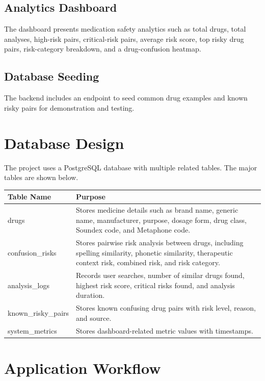 \documentclass[12pt,a4paper]{article}
\begin{document}
\subsection{Analytics Dashboard}

The dashboard presents medication safety analytics such as total drugs, total analyses, high-risk pairs, critical-risk pairs, average risk score, top risky drug pairs, risk-category breakdown, and a drug-confusion heatmap.

\subsection{Database Seeding}

The backend includes an endpoint to seed common drug examples and known risky pairs for demonstration and testing.

\section{Database Design}

The project uses a PostgreSQL database with multiple related tables. The major tables are shown below.

\begin{table}[h!]
\centering
{}
\begin{tabularx}{\textwidth}{p{3.7cm}Y}
\toprule
{}
\textbf{Table Name} & \textbf{Purpose} \\
\midrule
drugs & Stores medicine details such as brand name, generic name, manufacturer, purpose, dosage form, drug class, Soundex code, and Metaphone code. \\
confusion\_risks & Stores pairwise risk analysis between drugs, including spelling similarity, phonetic similarity, therapeutic context risk, combined risk, and risk category. \\
analysis\_logs & Records user searches, number of similar drugs found, highest risk score, critical risks found, and analysis duration. \\
known\_risky\_pairs & Stores known confusing drug pairs with risk level, reason, and source. \\
system\_metrics & Stores dashboard-related metric values with timestamps. \\
\bottomrule
\end{tabularx}
\end{table}

\section{Application Workflow}
\end{document}
